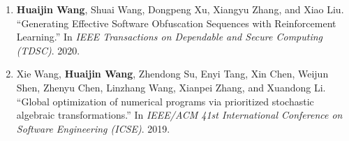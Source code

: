\begin{enumerate}
    
    \item \textbf{Huaijin Wang}, Shuai Wang, Dongpeng Xu, Xiangyu Zhang, and Xiao Liu.
    ``Generating Effective Software Obfuscation Sequences with Reinforcement Learning.''
    In \textit{IEEE Transactions on Dependable and Secure Computing (TDSC)}. 2020.
    
    \item Xie Wang, \textbf{Huaijin Wang}, Zhendong Su, Enyi Tang, Xin Chen, Weijun Shen, Zhenyu Chen, Linzhang Wang, Xianpei Zhang, and Xuandong Li.
    ``Global optimization of numerical programs via prioritized stochastic algebraic transformations.''
    In \textit{IEEE/ACM 41st
    International Conference on Software Engineering (ICSE)}. 2019.
\end{enumerate}